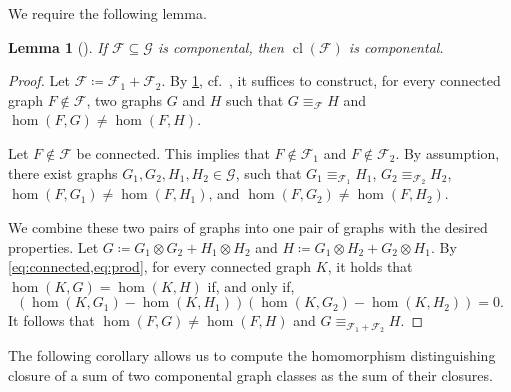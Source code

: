 \documentclass[11pt]{scrartcl}
\theoremstyle{definition}
\theoremstyle{plain}
\newtheorem{lemma}[definition]{Lemma}
\theoremstyle{remark}
\DeclareMathOperator{\cl}{cl}
\newcommand{\G}{\mathcal{G}}
\begin{document}
    We require the following lemma.


	\begin{lemma}[{\cite[Theorem~7]{seppelt_logical_2024}}]\label{lem:cl-componental}
		If $\mathcal{F} \subseteq \G$ is componental, then $\cl(\mathcal{F})$ is componental.
	\end{lemma}
    
    \lemComponentalClosed*
    \begin{proof}
        Let $\mathcal{F} \coloneqq \mathcal{F}_1 + \mathcal{F}_2$.
		By \cref{lem:cl-componental}, cf.\ \cite[Corollary~7.1.5]{seppelt_homomorphism_2024},
		it suffices to construct, for every connected graph $F \not\in \mathcal{F}$,
		two graphs $G$ and $H$ such that $G \equiv_{\mathcal{F}} H$
		and $\hom(F, G) \neq \hom(F, H)$.
        
		Let  $F \not\in \mathcal{F}$ be connected.
        This implies that $F\not\in \mathcal{F}_1$ and $F\not\in \mathcal{F}_2$.
		By assumption,
		there exist graphs $G_1, G_2, H_1, H_2 \in \G$,
		such that $G_1 \equiv_{\mathcal{F}_1} H_1$,
		$G_2 \equiv_{\mathcal{F}_2} H_2$,
		$\hom(F, G_1) \neq \hom(F, H_1)$,
		and $\hom(F, G_2) \neq \hom(F, H_2)$.
		
		We combine these two pairs of graphs into one pair of graphs with the desired properties.
		Let $G \coloneqq G_1 \otimes G_2 + H_1 \otimes H_2$
		and $H \coloneqq G_1 \otimes H_2 + G_2 \otimes H_1$.
        By \cref{eq:connected,eq:prod},
		for every connected graph $K$,
		it holds that $\hom(K, G) = \hom(K, H)$
		if, and only if,
		\[
			\left( \hom(K, G_1) - \hom(K, H_1) \right)
			\left( \hom(K, G_2) - \hom(K, H_2) \right)
			= 0.
		\]
		It follows that $\hom(F, G) \neq \hom(F, H)$
        and $G \equiv_{\mathcal{F}_1 + \mathcal{F}_2} H$.
	\end{proof}

    The following corollary allows us to compute the homomorphism distinguishing closure of a sum of two componental graph classes as the sum of their closures.
	
\end{document}
